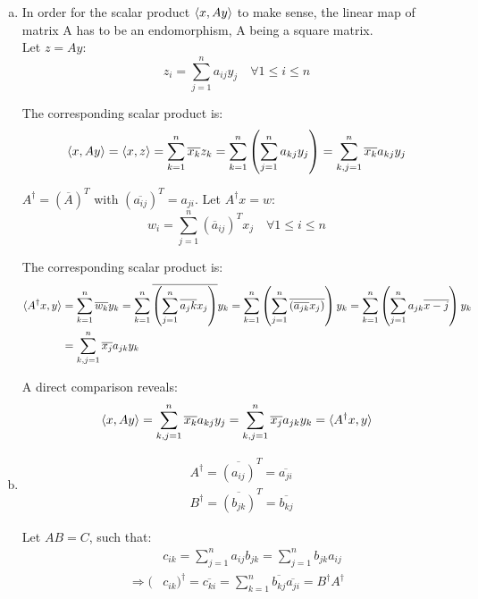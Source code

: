 \documentclass[a4paper,german,12pt,smallheadings]{scrartcl}
\begin{document}
\begin{enumerate}[(a)]

\item In order for the scalar product $\braket{x,Ay}$ to make sense, the linear map of matrix A has to be an endomorphism, A being a square matrix.\\

Let $z=Ay$:
\begin{equation*}
z_i=\sum_{j=1}^{n}a_{ij}y_j \quad \forall 1\le i\le n
\end{equation*}

The corresponding scalar product is:
\begin{align*}
\braket{x,Ay}=\braket{x,z}=\sum_{k=1}^{n}\overline{x_k}z_k=\sum_{k=1}^{n}\left(\sum_{j=1}^{n}a_{kj}y_j\right)=\sum_{k,j=1}^{n}\overline{x_k}a_{kj}y_j
\end{align*}

$A^\dagger=\left(\overline{A}\right)^T$ with $ \left(\overline{a_{ij}}\right)^T=a_{ji}$. Let $A^\dagger x=w$:
\begin{equation*}
w_i=\sum_{j=1}^{n}(\overline a_{ij})^T x_j \quad \forall 1\le i\le n
\end{equation*}

The corresponding scalar product is:
\begin{align*}
\braket{A^\dagger x,y}&=\sum_{k=1}^{n}\overline{w_k}y_k=\sum_{k=1}^{n}\overline{\left(\sum_{j=1}^{n}\overline{a_jk}x_j\right)}y_k=\sum_{k=1}^{n}\left(\sum_{j=1}^{n}\overline{\left(\overline{a_{jk}}x_j\right)}\right)y_k=\sum_{k=1}^{n}\left(\sum_{j=1}^{n}a_{jk}\overline{x-j}\right)y_k\\
&=\sum_{k,j=1}^{n}\overline{x_j}a_{jk}y_k
\end{align*}

A direct comparison reveals:
\begin{equation*}
\braket{x,Ay}=\sum_{k,j=1}^{n}\overline{x_k}a_{kj}y_j=\sum_{k,j=1}^{n}\overline{x_j}a_{jk}y_k=\braket{A^\dagger x,y}
\end{equation*}

\item 
\begin{align*}
& A^\dagger=\overline{(a_{ij})}^T=\overline{a_{ji}}\\
& B^\dagger=\overline{(b_{jk})}^T=\overline{b_{kj}}
\end{align*}

Let $AB=C$, such that:
\begin{align*}
& c_{ik}=\sum_{j=1}^{n}a_{ij}b_{jk}=\sum_{j=1}^{n}b_{jk}a_{ij}\\
\Rightarrow (& c_{ik})^\dagger=\overline{c_{ki}}=\sum_{k=1}^{n}\overline{b_{kj}}\overline{a_{ji}}=B^\dagger A^\dagger
\end{align*}


\end{enumerate}
\end{document}
